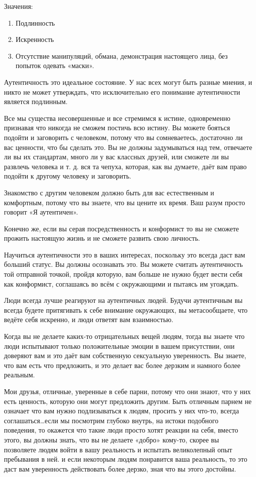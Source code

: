 Значения:

\begin{enumerate}
\item Подлинность
\item Искренность
\item Отсутствие манипуляций, обмана, демонстрация настоящего лица, без попыток одевать «маски».
\end{enumerate}

Аутентичность это идеальное состояние. У нас всех могут быть разные мнения, и никто не может утверждать, что исключительно его понимание аутентичности является подлинным.

Все мы существа несовершенные и все стремимся к истине, одновременно признавая что никогда не сможем постичь всю истину. Вы можете бояться подойти и заговорить с человеком, потому что вы сомневаетесь, достаточно ли вас ценности, что бы сделать это. Вы не должны задумываться над тем, отвечаете ли вы их стандартам, много ли у вас классных друзей, или сможете ли вы развлечь человека и т. д. вся та чепуха, которая, как вы думаете, даёт вам право подойти к другому человеку и заговорить.

Знакомство с другим человеком должно быть для вас естественным и комфортным, потому что вы знаете, что вы цените их время. Ваш разум просто говорит «Я аутентичен».

Конечно же, если вы серая посредственность и конформист то вы не сможете прожить настоящую жизнь и не сможете развить свою личность.

Научиться аутентичности это в ваших интересах, поскольку это всегда даст вам больший статус. Вы должны осознавать это. Вы можете считать аутентичность той отправной точкой, пройдя которую, вам больше не нужно будет вести себя как конформист, соглашаясь во всём с окружающими и пытаясь им угождать.

Люди всегда лучше реагируют на аутентичных людей. Будучи аутентичным вы всегда будете притягивать к себе внимание окружающих, вы метасообщаете, что ведёте себя искренно, и люди ответят вам взаимностью.

Когда вы не делаете каких-то отрицательных вещей людям, тогда вы знаете что люди испытывают только положительные эмоции в вашем присутствии, они доверяют вам и это даёт вам собственную сексуальную уверенность. Вы знаете, что вам есть что предложить, и это делает вас более дерзким и намного более реальным.

Мои друзья, отличные, уверенные в себе парни, потому что они знают, что у них есть ценность, которую они могут предложить другим. Быть отличным парнем не означает что вам нужно подлизываться к людям, просить у них что-то, всегда соглашаться\ldots если мы посмотрим глубоко внутрь, на истоки подобного поведения, то окажется что такие люди просто хотят реакции на себя, вместо этого, вы должны знать, что вы не делаете «добро» кому-то, скорее вы позволяете людям войти в вашу реальность и испытать великолепный опыт пребывания в ней. и если некоторым людям понравится ваша реальность, то это даст вам уверенность действовать более дерзко, зная что вы этого достойны.

